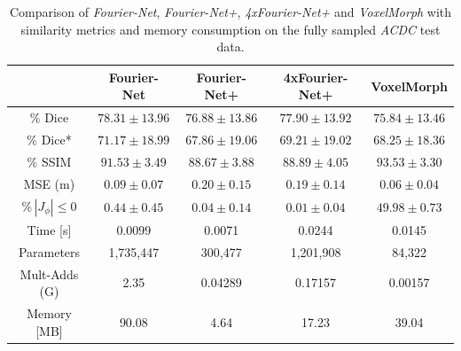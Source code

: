 \begin{table}[h] %
	\centering
	\caption{Comparison of \emph{Fourier-Net}, \emph{Fourier-Net+}, \emph{4xFourier-Net+} and \emph{VoxelMorph} with similarity metrics and memory consumption on the fully sampled \emph{ACDC} test data.}
	\label{tab:CompareVoxelMorph}
	\begin{tabular}{c c c c c} %
		\toprule
		 & Fourier-Net & Fourier-Net+ & 4xFourier-Net+ & VoxelMorph \\		
		\midrule
		$\%$ Dice & $78.31 \pm 13.96$ & $76.88 \pm 13.86$ & $77.90 \pm 13.92$ & $75.84 \pm 13.46$ \\
		$\%$ Dice* & $71.17 \pm 18.99$ & $67.86 \pm 19.06$ & $69.21 \pm 19.02$ & $68.25 \pm 18.36$ \\
		$\%$ SSIM & $91.53 \pm 3.49$ & $88.67 \pm 3.88$ & $88.89 \pm 4.05$ & $93.53 \pm 3.30$ \\
		MSE (m) & $0.09 \pm 0.07$ & $0.20 \pm 0.15$ & $0.19 \pm 0.14$ & $0.06 \pm 0.04$ \\
		$\% \, |J_{\phi}|\leq0$ & $0.44 \pm 0.45$ & $0.04 \pm 0.14$ & $0.01 \pm 0.04$ & $49.98 \pm 0.73$ \\
		Time [s] 	  & 0.0099    & 0.0071 	& 0.0244  	& 0.0145 \\
		Parameters 	  & 1,735,447 & 300,477 	& 1,201,908 	& 84,322 \\
		Mult-Adds (G) & 2.35      & 0.04289  & 0.17157  	& 0.00157 \\
		Memory [MB] 	  & 90.08     & 4.64   	& 17.23    	& 39.04 \\
		\bottomrule
	\end{tabular}		
\end{table}


